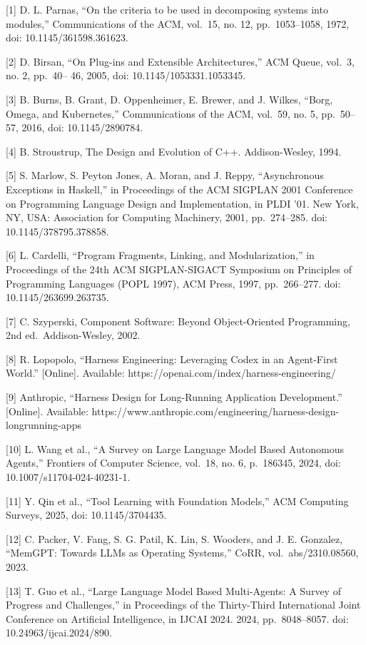 \documentclass[
  10
]{article}
\begin{document}
{[}1{]} D. L. Parnas, ``On the criteria to be used in decomposing
systems into modules,'' Communications of the ACM, vol.~15, no. 12,
pp.~1053--1058, 1972, doi: 10.1145/361598.361623.

{[}2{]} D. Birsan, ``On Plug-ins and Extensible Architectures,'' ACM
Queue, vol.~3, no. 2, pp.~40-- 46, 2005, doi: 10.1145/1053331.1053345.

{[}3{]} B. Burns, B. Grant, D. Oppenheimer, E. Brewer, and J. Wilkes,
``Borg, Omega, and Kubernetes,'' Communications of the ACM, vol.~59, no.
5, pp.~50--57, 2016, doi: 10.1145/2890784.

{[}4{]} B. Stroustrup, The Design and Evolution of C++. Addison-Wesley,
1994.

{[}5{]} S. Marlow, S. Peyton Jones, A. Moran, and J. Reppy,
``Asynchronous Exceptions in Haskell,'' in Proceedings of the ACM
SIGPLAN 2001 Conference on Programming Language Design and
Implementation, in PLDI '01. New York, NY, USA: Association for
Computing Machinery, 2001, pp.~274--285. doi: 10.1145/378795.378858.

{[}6{]} L. Cardelli, ``Program Fragments, Linking, and Modularization,''
in Proceedings of the 24th ACM SIGPLAN-SIGACT Symposium on Principles of
Programming Languages (POPL 1997), ACM Press, 1997, pp.~266--277. doi:
10.1145/263699.263735.

{[}7{]} C. Szyperski, Component Software: Beyond Object-Oriented
Programming, 2nd ed.~Addison-Wesley, 2002.

{[}8{]} R. Lopopolo, ``Harness Engineering: Leveraging Codex in an
Agent-First World.'' {[}Online{]}. Available:
https://openai.com/index/harness-engineering/

{[}9{]} Anthropic, ``Harness Design for Long-Running Application
Development.'' {[}Online{]}. Available:
https://www.anthropic.com/engineering/harness-design-longrunning-apps

{[}10{]} L. Wang et al., ``A Survey on Large Language Model Based
Autonomous Agents,'' Frontiers of Computer Science, vol.~18, no. 6,
p.~186345, 2024, doi: 10.1007/s11704-024-40231-1.

{[}11{]} Y. Qin et al., ``Tool Learning with Foundation Models,'' ACM
Computing Surveys, 2025, doi: 10.1145/3704435.

{[}12{]} C. Packer, V. Fang, S. G. Patil, K. Lin, S. Wooders, and J. E.
Gonzalez, ``MemGPT: Towards LLMs as Operating Systems,'' CoRR,
vol.~abs/2310.08560, 2023.

{[}13{]} T. Guo et al., ``Large Language Model Based Multi-Agents: A
Survey of Progress and Challenges,'' in Proceedings of the Thirty-Third
International Joint Conference on Artificial Intelligence, in IJCAI
2024. 2024, pp.~8048--8057. doi: 10.24963/ijcai.2024/890.
\end{document}

